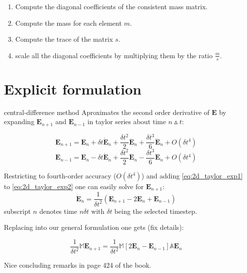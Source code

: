 \begin{enumerate}
\item Compute the diagonal coefficients of the consistent mass matrix.
\item Compute the mass for each element $m$.
\item Compute the trace of the matrix $s$.
\item scale all the diagonal coefficients by multiplying them by the ratio $\frac{m}{s}$.
\end{enumerate}

\section{Explicit formulation}
central-difference method
Aproximates the second order derivative of $\mathbf{E}$ by expanding $\mathbf{E}_{n+1}$ and $\mathbf{E}_{n-1}$  in taylor series about time $n \vartriangle t$:

\begin{equation}
\mathbf{E}_{n+1} = \mathbf{E}_n + \delta t \dot{\mathbf{E}}_n +\frac{\delta t^2}{2} \ddot{\mathbf{E}}_n +\frac{\delta t^3}{6} \dddot{\mathbf{E}}_n+ O(\delta t^4)
\label{eq:2d_taylor_exp1}
\end{equation}
\begin{equation}
\mathbf{E}_{n-1} = \mathbf{E}_n - \delta t \dot{\mathbf{E}}_n +\frac{\delta t^2}{2} \ddot{\mathbf{E}}_n-\frac{\delta t^3}{6} \dddot{\mathbf{E}}_n+ O(\delta t^4)
\label{eq:2d_taylor_exp2}
\end{equation}

Restricting to fourth-order accuracy ($O(\delta t^4)$) and  adding \ref{eq:2d_taylor_exp1} to \ref{eq:2d_taylor_exp2} one can easily solve for $\mathbf{E}_{n+1}$:
\begin{equation}
\ddot{\mathbf{E}}_n = \frac{1}{\delta t^2}\left(\mathbf{E}_{n+1}-2 \mathbf{E}_{n} + \mathbf{E}_{n-1}\right)
\label{eq:central-difference}
\end{equation}
subscript $n$ denotes time $n\delta t$ with $\delta t$ being the selected timestep.

Replacing into our general formulation one gets (fix details):

\begin{equation}
\frac{1}{\delta t^2} \mathbb{M} \mathbf{E}_{n+1} = \frac{1}{\delta t^2}\mathbb{M}\left[2
\mathbf{E}_{n}-\mathbf{E}_{n-1}
\right] \mathbb{A}\mathbf{E}_n 	 
\end{equation}

Nice concluding remarks in page 424 of the book.